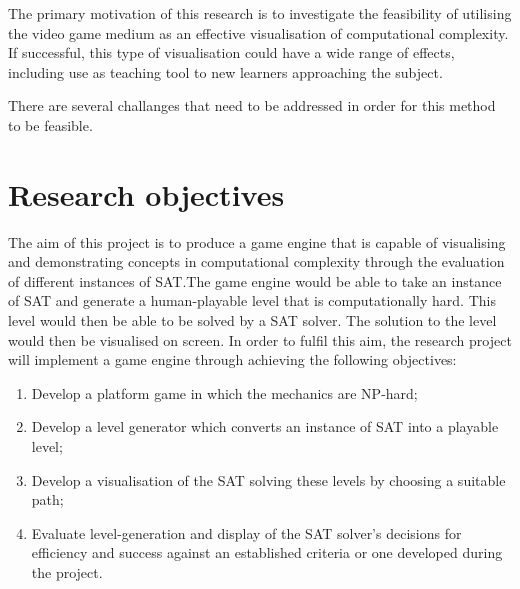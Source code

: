 \documentclass[11pt, a4paper, oneside]{report} %
\begin{document}
The primary motivation of this research is to investigate the feasibility of
utilising the video game medium as an effective visualisation of computational
complexity. If successful, this type of visualisation could have a wide range of
effects, including use as teaching tool to new learners  approaching the
subject. 


There are several challanges that need to be addressed in order for this method
to be feasible.

\section{Research objectives}


The aim of this project is to produce a game engine that is capable of
visualising and demonstrating concepts in computational complexity through the
evaluation of different instances of SAT.\@ The game engine would be able to
take an instance of SAT and generate a human-playable level that is
computationally hard. This level would then be able to be solved by a SAT
solver. The solution to the level would then be visualised on screen. In order
to fulfil this aim, the research project will implement a game engine through
achieving the following objectives: \\

\begin{enumerate}

  \item Develop a platform game in which the mechanics are NP-hard;
  \item Develop a level generator which converts an instance of SAT into a playable level;
  \item Develop a visualisation of the SAT solving these levels by choosing a suitable path;
  \item Evaluate level-generation and display of the SAT solver's decisions for
        efficiency and success against an established criteria or one developed
        during the project.

\end{enumerate}
\end{document}
